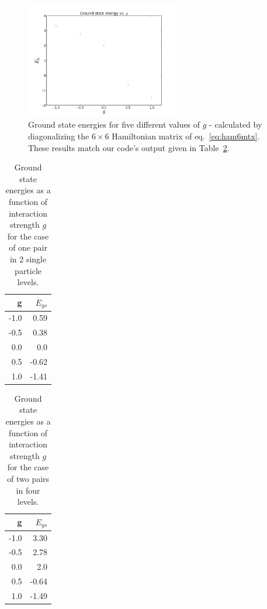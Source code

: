 \documentclass[11pt]{article}
\begin{document}
\begin{figure}
\center
	\includegraphics[width=0.6\textwidth]{lvl4pr2.png}
	\caption{Ground state energies for five different values of $g$ - calculated by diagonalizing the $6 \times 6$ Hamiltonian matrix of eq.~\ref{eq:ham6mtx}. These results match our code's output given in Table~\ref{tab:2pr4lvl}.}
	\label{fig:ezerovg}
\end{figure}




\begin{table}[h]
\begin{center}
\begin{tabular}{|r|r|}
\hline
  g   &  $E_{gs}$ \\ \hline
-1.0  &  0.59 \\
-0.5  &  0.38 \\
 0.0  &  0.0 \\
 0.5  &  -0.62 \\
 1.0  &  -1.41 \\
\hline
\end{tabular}
\end{center}
\caption{Ground state energies as a function of interaction strength $g$ for the case of one pair in 2 single particle levels.}
\label{tab:1pr2lvl}
\end{table}


\begin{table}[h]
\begin{center}
	\begin{tabular}{|r|r|}
\hline
	g   &  $E_{gs}$ \\ \hline
	-1.0  &  3.30 \\
	-0.5  &  2.78 \\
	 0.0  &  2.0 \\
	 0.5  &  -0.64 \\
	 1.0  &  -1.49 \\
\hline
	\end{tabular}
\end{center}
	\caption{Ground state energies as a function of interaction strength $g$ for the case of two pairs in four levels.}
	\label{tab:2pr4lvl}
\end{table}
\end{document}
